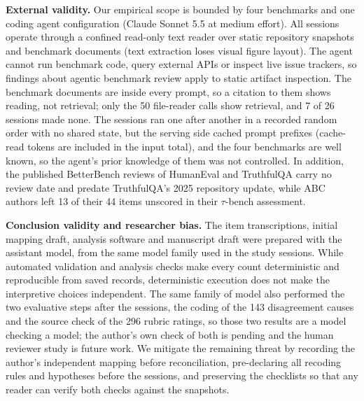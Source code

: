 \documentclass[10pt,conference]{IEEEtran}
\begin{document}
\textbf{External validity.} Our empirical scope is bounded by four benchmarks and one coding agent configuration (Claude Sonnet 5.5 at medium effort). All sessions operate through a confined read-only text reader over static repository snapshots and benchmark documents (text extraction loses visual figure layout). The agent cannot run benchmark code, query external APIs or inspect live issue trackers, so findings about agentic benchmark review apply to static artifact inspection. The benchmark documents are inside every prompt, so a citation to them shows reading, not retrieval; only the 50 file-reader calls show retrieval, and 7 of 26 sessions made none. The sessions ran one after another in a recorded random order with no shared state, but the serving side cached prompt prefixes (cache-read tokens are included in the input total), and the four benchmarks are well known, so the agent's prior knowledge of them was not controlled. In addition, the published BetterBench reviews of HumanEval and TruthfulQA carry no review date and predate TruthfulQA's 2025 repository update, while ABC authors left 13 of their 44 items unscored in their $\tau$-bench assessment.

\textbf{Conclusion validity and researcher bias.} The item transcriptions, initial mapping draft, analysis software and manuscript draft were prepared with the assistant model, from the same model family used in the study sessions. While automated validation and analysis checks make every count deterministic and reproducible from saved records, deterministic execution does not make the interpretive choices independent. The same family of model also performed the two evaluative steps after the sessions, the coding of the 143 disagreement causes and the source check of the 296 rubric ratings, so those two results are a model checking a model; the author's own check of both is pending and the human reviewer study is future work. We mitigate the remaining threat by recording the author's independent mapping before reconciliation, pre-declaring all recoding rules and hypotheses before the sessions, and preserving the checklists so that any reader can verify both checks against the snapshots.
\end{document}
